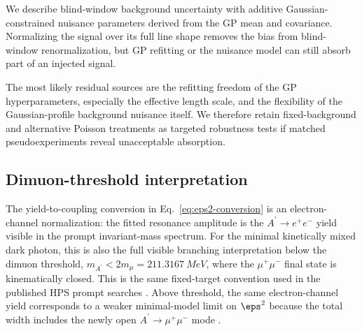 We describe blind-window background uncertainty with additive Gaussian-constrained
nuisance parameters derived from the GP mean and covariance. Normalizing the signal
over its full line shape removes the bias from blind-window renormalization, but GP
refitting or the nuisance model can still absorb part of an injected signal.

The most likely residual sources are the refitting freedom of the GP hyperparameters,
especially the effective length scale, and the flexibility of the Gaussian-profile
background nuisance itself. We therefore retain fixed-background and alternative
Poisson treatments as targeted robustness tests if matched pseudoexperiments reveal
unacceptable absorption.

\subsection{Dimuon-threshold interpretation}
\label{sec:methodology-dimuon-threshold}

The yield-to-coupling conversion in Eq.~\eqref{eq:eps2-conversion} is an
electron-channel normalization: the fitted resonance amplitude is the
$A^\prime\to e^+e^-$ yield visible in the prompt invariant-mass spectrum. For the
minimal kinetically mixed dark photon, this is also the full visible branching
interpretation below the dimuon threshold, $m_{A^\prime}<2m_\mu=\SI{211.3167}{MeV}$,
where the $\mu^+\mu^-$ final state is kinematically closed. This is the same
fixed-target convention used in the published HPS prompt searches
\cite{EssigEtAl2011,HPS2015DarkPhoton,HPS2016PromptLong}. Above threshold, the same
electron-channel yield corresponds to a weaker minimal-model limit on $\eps^2$ because
the total width includes the newly open $A^\prime\to\mu^+\mu^-$ mode
\cite{Holdom1986,Fabbrichesi2020DarkPhoton}.

